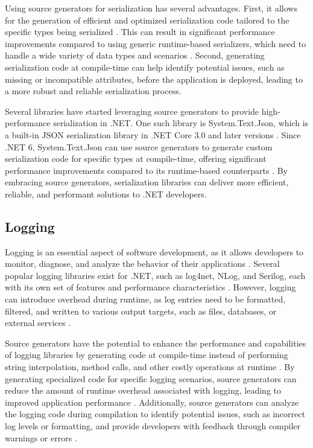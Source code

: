 Using source generators for serialization has several advantages. First, it allows for the generation of efficient and optimized serialization code tailored to the specific types being serialized \cite{CSharpRoslyn}. This can result in significant performance improvements compared to using generic runtime-based serializers, which need to handle a wide variety of data types and scenarios \cite{NewtonsoftJsonPerformance}. Second, generating serialization code at compile-time can help identify potential issues, such as missing or incompatible attributes, before the application is deployed, leading to a more robust and reliable serialization process.

Several libraries have started leveraging source generators to provide high-performance serialization in .NET. One such library is System.Text.Json, which is a built-in JSON serialization library in .NET Core 3.0 and later versions \cite{SystemTextJson}. Since .NET 6, System.Text.Json can use source generators to generate custom serialization code for specific types at compile-time, offering significant performance improvements compared to its runtime-based counterparts \cite{SystemTextJsonSourceGen}. By embracing source generators, serialization libraries can deliver more efficient, reliable, and performant solutions to .NET developers.

\subsection{Logging}

Logging is an essential aspect of software development, as it allows developers to monitor, diagnose, and analyze the behavior of their applications \cite{Fowler2002}. Several popular logging libraries exist for .NET, such as log4net, NLog, and Serilog, each with its own set of features and performance characteristics \cite{LoggingDotnet}. However, logging can introduce overhead during runtime, as log entries need to be formatted, filtered, and written to various output targets, such as files, databases, or external services \cite{Serilog}.

Source generators have the potential to enhance the performance and capabilities of logging libraries by generating code at compile-time instead of performing string interpolation, method calls, and other costly operations at runtime \cite{CSharpRoslyn}. By generating specialized code for specific logging scenarios, source generators can reduce the amount of runtime overhead associated with logging, leading to improved application performance \cite{Carter2020}. Additionally, source generators can analyze the logging code during compilation to identify potential issues, such as incorrect log levels or formatting, and provide developers with feedback through compiler warnings or errors \cite{Torgersen2020}.

